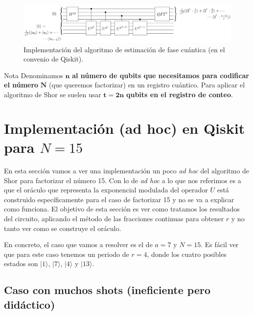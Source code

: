 \documentclass[a4paper,11pt]{book} %
\numberwithin{equation}{chapter}
\begin{document}
\begin{figure}[H]
\centering 
\includegraphics[width=1\linewidth]{Figuras/Fig-3_QPE-Shor.png}
\caption{Implementación del algoritmo de estimación de fase cuántica (en el convenio de Qiskit).}
\label{Fig_QPE-qiskit}
\end{figure}


\begin{mybox_blue}{Nota}
Denominamos $\bm n$ \textbf{al número de qubits que necesitamos para codificar el número} $\bm N$ (que queremos factorizar) en un registro cuántico. Para aplicar el algoritmo de Shor se suelen usar $\bm{t=2n}$ \textbf{qubits en el registro de conteo}.
\end{mybox_blue}


\section{Implementación (ad hoc) en Qiskit para $N=15$}

En esta sección vamos a ver una implementación un poco \textit{ad hoc} del algoritmo de Shor para factorizar el número 15. Con lo de \textit{ad hoc} a lo que nos referimos es a que el oráculo que representa la exponencial modulada del operador $U$ está construido específicamente para el caso de factorizar 15 y no se va a explicar como funciona. El objetivo de esta sección es ver como tratamos los resultados del circuito, aplicando el método de las fracciones continuas \cite{bib_Continued_fraction} para obtener $r$ y no tanto ver como se construye el oráculo. 

En concreto, el caso que vamos a resolver es el de $a=7$ y $N=15$. Es fácil ver que para este caso tenemos un periodo de $r = 4$, donde los cuatro posibles estados son $| 1 \rangle$, $| 7 \rangle$, $| 4 \rangle$ y $| 13 \rangle$. 





\subsection{Caso con muchos shots (ineficiente pero didáctico)}
\end{document}
